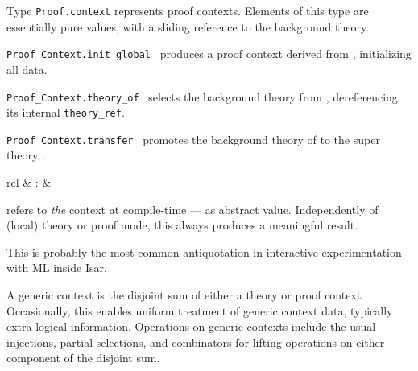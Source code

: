 \begin{isabellebody}
\begin{isamarkuptext}
  \begin{description}

  \item Type \verb|Proof.context| represents proof contexts.
  Elements of this type are essentially pure values, with a sliding
  reference to the background theory.

  \item \verb|Proof_Context.init_global|~ produces a proof context
  derived from , initializing all data.

  \item \verb|Proof_Context.theory_of|~ selects the
  background theory from , dereferencing its internal
  \verb|theory_ref|.

  \item \verb|Proof_Context.transfer|~ promotes the
  background theory of  to the super theory .

  \end{description}%
\end{isamarkuptext}%
\isamarkuptrue%
%
\endisatagmlref
{\isafoldmlref}%
%
\isadelimmlref
%
\endisadelimmlref
%
\isadelimmlantiq
%
\endisadelimmlantiq
%
\isatagmlantiq
%
\begin{isamarkuptext}%
\begin{matharray}{rcl}
  \hypertarget{ML antiquotation.context}{\hyperlink{ML antiquotation.context}{\mbox{}}} & : &  \\
  \end{matharray}

  \begin{description}

  \item {} refers to \emph{the} context at
  compile-time --- as abstract value.  Independently of (local) theory
  or proof mode, this always produces a meaningful result.

  This is probably the most common antiquotation in interactive
  experimentation with ML inside Isar.

  \end{description}%
\end{isamarkuptext}%
\isamarkuptrue%
%
\endisatagmlantiq
{\isafoldmlantiq}%
%
\isadelimmlantiq
%
\endisadelimmlantiq
%
\isamarkuptrue%
%
\begin{isamarkuptext}%
A generic context is the disjoint sum of either a theory or proof
  context.  Occasionally, this enables uniform treatment of generic
  context data, typically extra-logical information.  Operations on
  generic contexts include the usual injections, partial selections,
  and combinators for lifting operations on either component of the
  disjoint sum.


\end{isamarkuptext}
\end{isabellebody}
